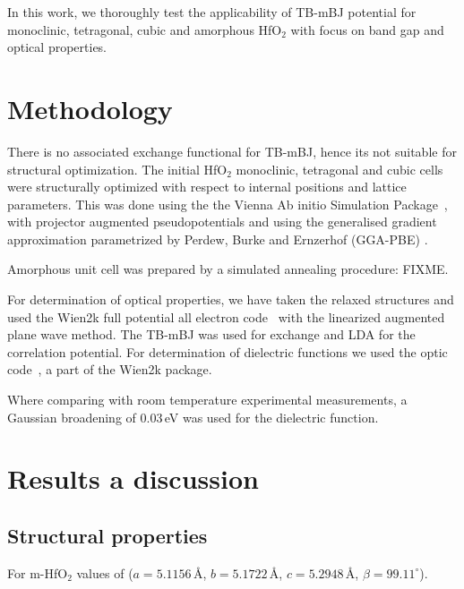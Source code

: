 \documentclass[10pt,a4paper,twocolumn]{article}
\begin{document}

In this work, we thoroughly test the applicability of TB-mBJ potential for monoclinic, tetragonal, cubic and amorphous HfO$_2$ with focus on band gap and optical properties.

\section{Methodology}

There is no associated exchange functional for TB-mBJ, hence its not suitable for structural optimization.
The initial HfO$_2$ monoclinic, tetragonal and cubic cells were structurally optimized with respect to internal positions and lattice parameters. 
This was done using the the Vienna Ab initio Simulation Package~\cite{Kresse1996}, with projector augmented pseudopotentials \cite{Kresse1999} and using the generalised gradient approximation parametrized by Perdew, Burke and Ernzerhof (GGA-PBE) \cite{Perdew1996}. 

Amorphous unit cell was prepared by a simulated annealing procedure: FIXME.

For determination of optical properties, we have taken the relaxed structures and used the Wien2k full potential all electron code~\cite{Blaha2001} with the linearized augmented plane wave method. The TB-mBJ was used for exchange and LDA for the correlation potential. For determination of dielectric functions we used the optic code~\cite{AmbroschDraxl2006}, a part of the Wien2k package.

Where comparing with room temperature experimental measurements, a Gaussian broadening of 0.03\,eV was used for the dielectric function. 

\section{Results a discussion}

\subsection{Structural properties}

For m-HfO$_2$ values of \citet{Adam1959} ($a = 5.1156$\,\r{A}, $b = 5.1722$\,\r{A}, $c = 5.2948$\,\r{A}, $\beta = 99.11^\circ$).
\end{document}
